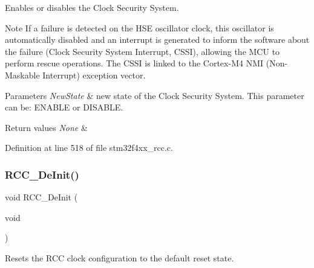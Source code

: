 Enables or disables the Clock Security System. 

\begin{DoxyNote}{Note}
If a failure is detected on the H\+SE oscillator clock, this oscillator is automatically disabled and an interrupt is generated to inform the software about the failure (Clock Security System Interrupt, C\+S\+SI), allowing the M\+CU to perform rescue operations. The C\+S\+SI is linked to the Cortex-\/\+M4 N\+MI (Non-\/\+Maskable Interrupt) exception vector. 
\end{DoxyNote}

\begin{DoxyParams}{Parameters}
{\em New\+State} & new state of the Clock Security System. This parameter can be\+: E\+N\+A\+B\+LE or D\+I\+S\+A\+B\+LE. \\
\hline
\end{DoxyParams}

\begin{DoxyRetVals}{Return values}
{\em None} & \\
\hline
\end{DoxyRetVals}


Definition at line 518 of file stm32f4xx\+\_\+rcc.\+c.

\mbox{\label{group___r_c_c___group1_ga413f6422be11b1334abe60b3bff2e062}} 
\subsubsection{\texorpdfstring{R\+C\+C\+\_\+\+De\+Init()}{RCC\_DeInit()}}
{\footnotesize\ttfamily void R\+C\+C\+\_\+\+De\+Init (\begin{DoxyParamCaption}\item[{void}]{ }\end{DoxyParamCaption})}



Resets the R\+CC clock configuration to the default reset state. 

